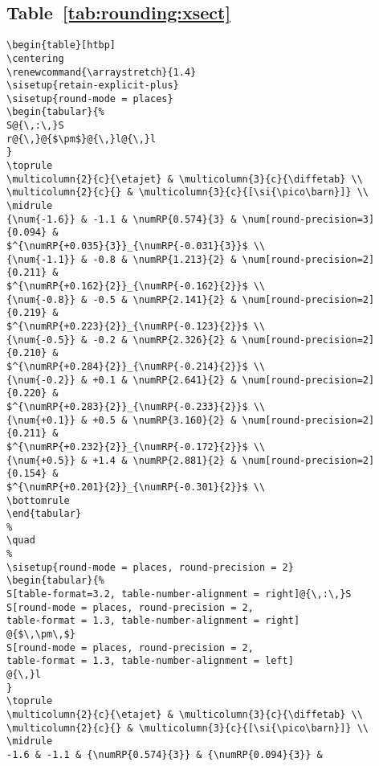 \documentclass[UKenglish]{latex/atlasdoc}
\newcommand*{\numRP}[2]{\num[round-mode=places, round-precision=#2]{#1}}
\newcommand*{\dif}{\text{d}}
\newcommand*{\etajet}{\ensuremath{\eta_{\text{jet}}}\xspace}
\newcommand*{\diffetab}{\ensuremath{\dif\sigma^{b} / \dif\eta^{b}}\xspace}
\begin{document}
\subsection{Table~\protect\ref{tab:rounding:xsect}}
\begin{verbatim}
\begin{table}[htbp]
\centering
\renewcommand{\arraystretch}{1.4}
\sisetup{retain-explicit-plus}
\sisetup{round-mode = places}
\begin{tabular}{%
S@{\,:\,}S
r@{\,}@{$\pm$}@{\,}l@{\,}l
}
\toprule
\multicolumn{2}{c}{\etajet} & \multicolumn{3}{c}{\diffetab} \\
\multicolumn{2}{c}{} & \multicolumn{3}{c}{[\si{\pico\barn}]} \\
\midrule
{\num{-1.6}} & -1.1 & \numRP{0.574}{3} & \num[round-precision=3]{0.094} & 
$^{\numRP{+0.035}{3}}_{\numRP{-0.031}{3}}$ \\
{\num{-1.1}} & -0.8 & \numRP{1.213}{2} & \num[round-precision=2]{0.211} & 
$^{\numRP{+0.162}{2}}_{\numRP{-0.162}{2}}$ \\
{\num{-0.8}} & -0.5 & \numRP{2.141}{2} & \num[round-precision=2]{0.219} & 
$^{\numRP{+0.223}{2}}_{\numRP{-0.123}{2}}$ \\
{\num{-0.5}} & -0.2 & \numRP{2.326}{2} & \num[round-precision=2]{0.210} & 
$^{\numRP{+0.284}{2}}_{\numRP{-0.214}{2}}$ \\
{\num{-0.2}} & +0.1 & \numRP{2.641}{2} & \num[round-precision=2]{0.220} & 
$^{\numRP{+0.283}{2}}_{\numRP{-0.233}{2}}$ \\
{\num{+0.1}} & +0.5 & \numRP{3.160}{2} & \num[round-precision=2]{0.211} & 
$^{\numRP{+0.232}{2}}_{\numRP{-0.172}{2}}$ \\
{\num{+0.5}} & +1.4 & \numRP{2.881}{2} & \num[round-precision=2]{0.154} & 
$^{\numRP{+0.201}{2}}_{\numRP{-0.301}{2}}$ \\
\bottomrule
\end{tabular}
%
\quad
%
\sisetup{round-mode = places, round-precision = 2}
\begin{tabular}{%
S[table-format=3.2, table-number-alignment = right]@{\,:\,}S
S[round-mode = places, round-precision = 2,
table-format = 1.3, table-number-alignment = right]
@{$\,\pm\,$}
S[round-mode = places, round-precision = 2,
table-format = 1.3, table-number-alignment = left]
@{\,}l
}
\toprule
\multicolumn{2}{c}{\etajet} & \multicolumn{3}{c}{\diffetab} \\
\multicolumn{2}{c}{} & \multicolumn{3}{c}{[\si{\pico\barn}]} \\
\midrule
-1.6 & -1.1 & {\numRP{0.574}{3}} & {\numRP{0.094}{3}} & 

\end{verbatim}
\end{document}
